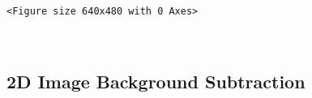 \documentclass[11pt]{article}
\begin{document}
    
    \begin{Verbatim}[commandchars=\\\{\}]
<Figure size 640x480 with 0 Axes>
    \end{Verbatim}

    
    \begin{center}
    \end{center}
    { \hspace*{\fill} \\}
    
    \subsection{2D Image Background
Subtraction}\label{d-image-background-subtraction}
\end{document}
